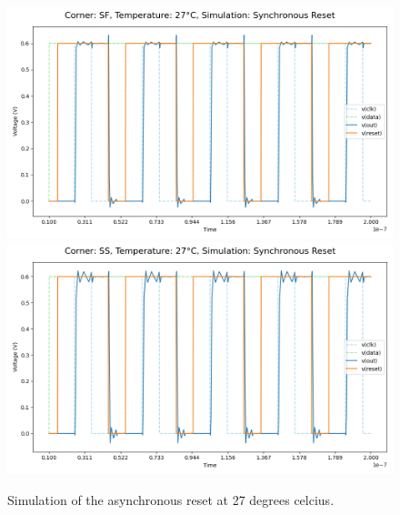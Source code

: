 \begin{figure}[H]
    \vspace{5pt}
    \includegraphics[height= 0.21\textheight]{figures/aimspice/SF27W3.png}
    \vspace{5pt}
    \includegraphics[height= 0.21\textheight]{figures/aimspice/SS27W3.png}
    \caption{Simulation of the asynchronous reset at 27 degrees celcius.}
    \label{fig:aimspice_W3_27}
\end{figure}

\pagebreak

